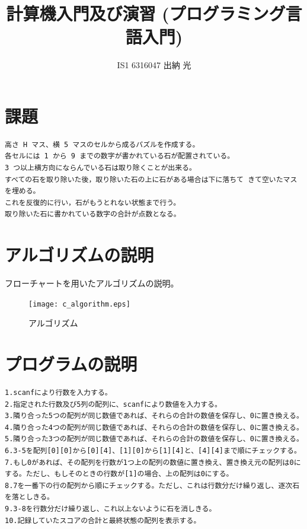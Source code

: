 \documentclass{jarticle}
\title{計算機入門及び演習 (プログラミング言語入門)}
\author{IS1 6316047 出納 光}
\begin{document}
\maketitle

\section{課題}
\begin{verbatim}
高さ H マス、横 5 マスのセルから成るパズルを作成する。
各セルには 1 から 9 までの数字が書かれている石が配置されている。
3 つ以上横方向にならんでいる石は取り除くことが出来る。
すべての石を取り除いた後，取り除いた石の上に石がある場合は下に落ちて きて空いたマスを埋める。
これを反復的に行い，石がもうとれない状態まで行う。
取り除いた石に書かれている数字の合計が点数となる。
\end{verbatim}

\newpage
\section{アルゴリズムの説明}
フローチャートを用いたアルゴリズムの説明。
\begin{figure}[!h]
\begin{center}
\texttt{[image: c\_algorithm.eps]}
\end{center}
\caption{アルゴリズム}
\end{figure}

\newpage
\section{プログラムの説明}
\begin{verbatim}
1.scanfにより行数を入力する。
2.指定された行数及び5列の配列に、scanfにより数値を入力する。
3.隣り合った5つの配列が同じ数値であれば、それらの合計の数値を保存し、0に置き換える。
4.隣り合った4つの配列が同じ数値であれば、それらの合計の数値を保存し、0に置き換える。
5.隣り合った3つの配列が同じ数値であれば、それらの合計の数値を保存し、0に置き換える。
6.3-5を配列[0][0]から[0][4]、[1][0]から[1][4]と、[4][4]まで順にチェックする。
7.もし0があれば、その配列を行数が1つ上の配列の数値に置き換え、置き換え元の配列は0にする。ただし、もしそのときの行数が[1]の場合、上の配列は0にする。
8.7を一番下の行の配列から順にチェックする。ただし、これは行数分だけ繰り返し、逐次石を落としきる。
9.3-8を行数分だけ繰り返し、これ以上ないように石を消しきる。
10.記録していたスコアの合計と最終状態の配列を表示する。
\end{verbatim}
\end{document}
